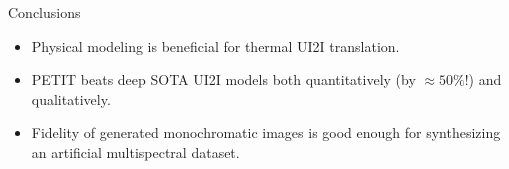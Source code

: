 \begin{frame}{Conclusions}
    \begin{itemize}
      \item Physical modeling is beneficial for thermal UI2I translation. 
      \item PETIT beats deep SOTA UI2I models both quantitatively (by $\approx 50\%$!) and qualitatively.
      \item Fidelity of generated monochromatic images is good enough for synthesizing an artificial multispectral dataset.
    \end{itemize}
\end{frame}
